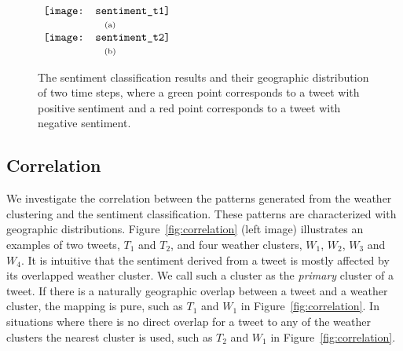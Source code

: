 \begin{figure}[t]
\begin{center}
$\begin{array}{c}
\texttt{[image: sentiment\_t1]} \\
\mbox{\small{(a)}} \\
\texttt{[image: sentiment\_t2]} \\
\mbox{\small{(b)}}
\end{array}$
\end{center}
\vspace{-.1in}
\caption{The sentiment classification results and their geographic distribution of two time steps, where a green point corresponds to a tweet with positive sentiment and a red point corresponds to a tweet with negative sentiment.}
\label{fig:sentiment}
\end{figure}


\subsection{Correlation}
\label{sec:corr}

We investigate the correlation between the patterns generated from the weather clustering and the sentiment classification. These patterns are characterized with geographic distributions. Figure~\ref{fig:correlation} (left image) illustrates an examples of two tweets, $T_1$ and $T_2$, and four weather clusters, $W_1$, $W_2$, $W_3$ and $W_4$. It is intuitive that the sentiment derived from a tweet is mostly affected by its overlapped weather cluster. We call such a cluster as the \emph{primary} cluster of a tweet. If there is a naturally geographic overlap between a tweet and a weather cluster, the mapping is pure, such as $T_1$ and $W_1$ in Figure~\ref{fig:correlation}. In situations where there is no direct overlap for a tweet to any of the weather clusters the nearest cluster is used, such as $T_2$ and $W_1$ in Figure~\ref{fig:correlation}.


